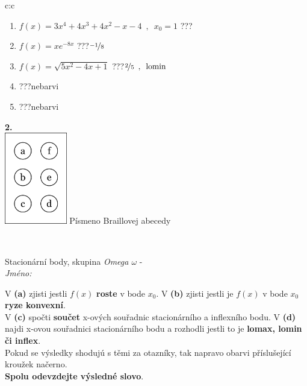 \documentclass[10pt]{report}
\begin{document}
\begin{tabular}{c:c}
\begin{minipage}[c][104.5mm][t]{0.5\linewidth}
\begin{center}
\begin{minipage}{0.79\linewidth}
\begin{center}
\begin{varwidth}{\linewidth}
\begin{enumerate}
\item $f(x)=3x^4+4x^3+4x^2-x-4\enspace , \enspace x_0=1$\quad \dotfill\; ???\;\dotfill \quad {}
\item $f(x)=xe^{-8x}$\quad \dotfill\; ???\;\dotfill \quad $\nicefrac{-1}{8}$
\item $f(x)=\sqrt{5x^2-4x+1}$\quad \dotfill\; ???\;\dotfill \quad $\nicefrac{2}{5}\enspace , \enspace \mathrm{lomin}$
\item \quad \dotfill\; ???\;\dotfill \quad nebarvi
\item \quad \dotfill\; ???\;\dotfill \quad nebarvi
\end{enumerate}
\end{varwidth}
\end{center}
\end{minipage}
\begin{minipage}{0.20\linewidth}
\begin{center}
{\Huge\bfseries 2.} \\[2mm]
\includegraphics[height=40mm]{../images/braille.png}
{\small Písmeno Braillovej abecedy}
\end{center}
\end{minipage}
\end{center}
\end{minipage}
\\ \hdashline
\begin{minipage}[c][104.5mm][t]{0.5\linewidth}
\begin{center}
\vspace{7mm}
{\huge Stacionární body, skupina \textit{Omega $\omega$} -}\\[5mm]
\textit{Jméno:}\phantom{xxxxxxxxxxxxxxxxxxxxxxxxxxxxxxxxxxxxxxxxxxxxxxxxxxxxxxxxxxxxxxxxx}\\[5mm]
\begin{minipage}{0.95\linewidth}
\begin{center}
{\small V \textbf{(a)} zjisti jestli $f(x)$ \textbf{roste} v bode $x_0$. V \textbf{(b)} zjisti jestli je $f(x)$ v bode $x_0$ \textbf{ryze konvexní}.\\V \textbf{(c)} spočti \textbf{součet} x-ových souřadnic stacionárního a inflexního bodu. V \textbf{(d)} najdi x-ovou souřadnici stacionárního bodu a rozhodli jestli to je \textbf{lomax, lomin či inflex}.\\Pokud se výsledky shodujú s těmi za otazníky, tak napravo obarvi příslušející kroužek načerno.\\\textbf{Spolu odevzdejte výsledné slovo}}.

\end{center}
\end{minipage}
\end{center}
\end{minipage}
\end{tabular}
\end{document}
